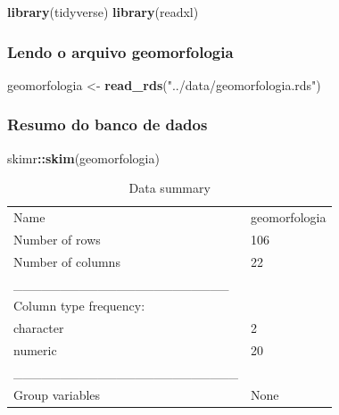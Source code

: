 \documentclass[
]{article}
\newenvironment{Shaded}{\begin{snugshade}}{\end{snugshade}}
\newcommand{\FunctionTok}[1]{\textcolor[rgb]{0.13,0.29,0.53}{\textbf{#1}}}
\newcommand{\NormalTok}[1]{#1}
\newcommand{\OtherTok}[1]{\textcolor[rgb]{0.56,0.35,0.01}{#1}}
\newcommand{\SpecialCharTok}[1]{\textcolor[rgb]{0.81,0.36,0.00}{\textbf{#1}}}
\newcommand{\StringTok}[1]{\textcolor[rgb]{0.31,0.60,0.02}{#1}}
\begin{document}
\begin{Shaded}
\begin{Highlighting}[]
\FunctionTok{library}\NormalTok{(tidyverse)}
\FunctionTok{library}\NormalTok{(readxl)}
\end{Highlighting}
\end{Shaded}

\hypertarget{lendo-o-arquivo-geomorfologia}{%
\subsubsection{Lendo o arquivo
geomorfologia}\label{lendo-o-arquivo-geomorfologia}}

\begin{Shaded}
\begin{Highlighting}[]
\NormalTok{geomorfologia }\OtherTok{\textless{}{-}} \FunctionTok{read\_rds}\NormalTok{(}\StringTok{"../data/geomorfologia.rds"}\NormalTok{)}
\end{Highlighting}
\end{Shaded}

\hypertarget{resumo-do-banco-de-dados}{%
\subsubsection{Resumo do banco de
dados}\label{resumo-do-banco-de-dados}}

\begin{Shaded}
\begin{Highlighting}[]
\NormalTok{skimr}\SpecialCharTok{::}\FunctionTok{skim}\NormalTok{(geomorfologia)}
\end{Highlighting}
\end{Shaded}

\begin{longtable}[]{@{}ll@{}}
\caption{Data summary}\tabularnewline
\toprule\noalign{}
\endfirsthead
\endhead
\bottomrule\noalign{}
\endlastfoot
Name & geomorfologia \\
Number of rows & 106 \\
Number of columns & 22 \\
\_\_\_\_\_\_\_\_\_\_\_\_\_\_\_\_\_\_\_\_\_\_\_ & \\
Column type frequency: & \\
character & 2 \\
numeric & 20 \\
\_\_\_\_\_\_\_\_\_\_\_\_\_\_\_\_\_\_\_\_\_\_\_\_ & \\
Group variables & None \\
\end{longtable}
\end{document}
